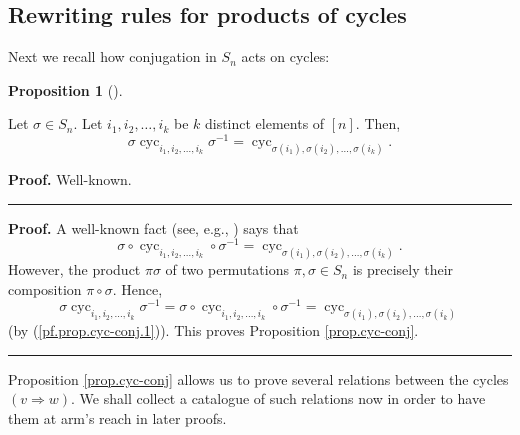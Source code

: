\documentclass[numbers=enddot,12pt,final,onecolumn,notitlepage]{scrartcl}%
\theoremstyle{definition}
\newtheorem{prop}[theo]{Proposition}
\newenvironment{proposition}[1][]
{\begin{prop}[#1]\begin{leftbar}}
{\end{leftbar}\end{prop}}
\newenvironment{verlong}{}{}
\newenvironment{vershort}{}{}
\newenvironment{proof}[1][Proof]{\noindent\textbf{#1.} }{\ \rule{0.5em}{0.5em}}
\begin{document}
\subsection{Rewriting rules for products of cycles}

Next we recall how conjugation in $S_{n}$ acts on cycles:

\begin{proposition}
\label{prop.cyc-conj}Let $\sigma\in S_{n}$. Let $i_{1},i_{2},\ldots,i_{k}$ be
$k$ distinct elements of $\left[  n\right]  $. Then,%
\begin{equation}
\sigma\operatorname*{cyc}\nolimits_{i_{1},i_{2},\ldots,i_{k}}\sigma
^{-1}=\operatorname*{cyc}\nolimits_{\sigma\left(  i_{1}\right)  ,\sigma\left(
i_{2}\right)  ,\ldots,\sigma\left(  i_{k}\right)  }.
\label{eq.prop.cyc-conj.eq}%
\end{equation}

\end{proposition}

\begin{vershort}


\begin{proof}
Well-known.
\end{proof}
\end{vershort}

\begin{verlong}


\begin{proof}
A well-known fact (see, e.g., \cite[Exercise 5.17 \textbf{(a)}]{detnotes})
says that%
\begin{equation}
\sigma\circ\operatorname*{cyc}\nolimits_{i_{1},i_{2},\ldots,i_{k}}\circ
\sigma^{-1}=\operatorname*{cyc}\nolimits_{\sigma\left(  i_{1}\right)
,\sigma\left(  i_{2}\right)  ,\ldots,\sigma\left(  i_{k}\right)  }.
\label{pf.prop.cyc-conj.1}%
\end{equation}
However, the product $\pi\sigma$ of two permutations $\pi,\sigma\in S_{n}$ is
precisely their composition $\pi\circ\sigma$. Hence,%
\[
\sigma\operatorname*{cyc}\nolimits_{i_{1},i_{2},\ldots,i_{k}}\sigma
^{-1}=\sigma\circ\operatorname*{cyc}\nolimits_{i_{1},i_{2},\ldots,i_{k}}%
\circ\sigma^{-1}=\operatorname*{cyc}\nolimits_{\sigma\left(  i_{1}\right)
,\sigma\left(  i_{2}\right)  ,\ldots,\sigma\left(  i_{k}\right)  }%
\]
(by (\ref{pf.prop.cyc-conj.1})). This proves Proposition \ref{prop.cyc-conj}.
\end{proof}
\end{verlong}

Proposition \ref{prop.cyc-conj} allows us to prove several relations between
the cycles $\left(  v\Longrightarrow w\right)  $. We shall collect a catalogue
of such relations now in order to have them at arm's reach in later proofs.
\end{document}
